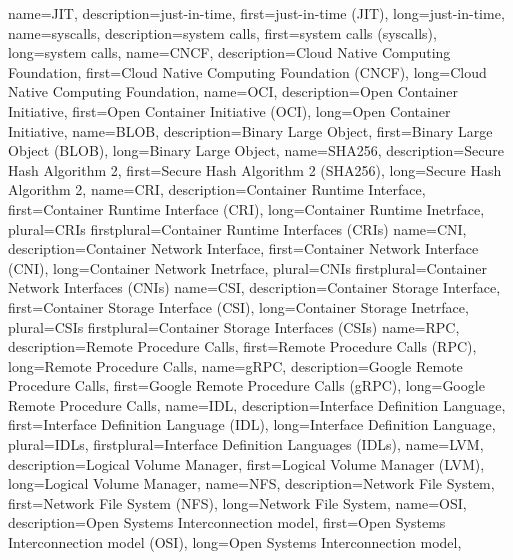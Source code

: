 {%
    name={JIT},
    description={just-in-time},
    first={just-in-time (JIT)},
    long={just-in-time},
}
{%
    name={syscalls},
    description={system calls},
    first={system calls (syscalls)},
    long={system calls},
}
{%
    name={CNCF},
    description={Cloud Native Computing Foundation},
    first={Cloud Native Computing Foundation (CNCF)},
    long={Cloud Native Computing Foundation},
}
{%
    name={OCI},
    description={Open Container Initiative},
    first={Open Container Initiative (OCI)},
    long={Open Container Initiative},
}
{%
    name={BLOB},
    description={Binary Large Object},
    first={Binary Large Object (BLOB)},
    long={Binary Large Object},
}
{%
    name={SHA256},
    description={Secure Hash Algorithm 2},
    first={Secure Hash Algorithm 2 (SHA256)},
    long={Secure Hash Algorithm 2},
}
{%
    name={CRI},
    description={Container Runtime Interface},
    first={Container Runtime Interface (CRI)},
    long={Container Runtime Inetrface},
    plural={CRIs}
    firstplural={Container Runtime Interfaces (CRIs)}
}
{%
    name={CNI},
    description={Container Network Interface},
    first={Container Network Interface (CNI)},
    long={Container Network Inetrface},
    plural={CNIs}
    firstplural={Container Network Interfaces (CNIs)}
}
{%
    name={CSI},
    description={Container Storage Interface},
    first={Container Storage Interface (CSI)},
    long={Container Storage Inetrface},
    plural={CSIs}
    firstplural={Container Storage Interfaces (CSIs)}
}
{%
    name={RPC},
    description={Remote Procedure Calls},
    first={Remote Procedure Calls (RPC)},
    long={Remote Procedure Calls},
}
{%
    name={gRPC},
    description={Google Remote Procedure Calls},
    first={Google Remote Procedure Calls (gRPC)},
    long={Google Remote Procedure Calls},
}
{%
    name={IDL},
    description={Interface Definition Language},
    first={Interface Definition Language (IDL)},
    long={Interface Definition Language},
    plural={IDLs},
    firstplural={Interface Definition Languages (IDLs)},
}
{%
    name={LVM},
    description={Logical Volume Manager},
    first={Logical Volume Manager (LVM)},
    long={Logical Volume Manager},
}
{%
    name={NFS},
    description={Network File System},
    first={Network File System (NFS)},
    long={Network File System},
}
{%
    name={OSI},
    description={Open Systems Interconnection model},
    first={Open Systems Interconnection model (OSI)},
    long={Open Systems Interconnection model},
}




